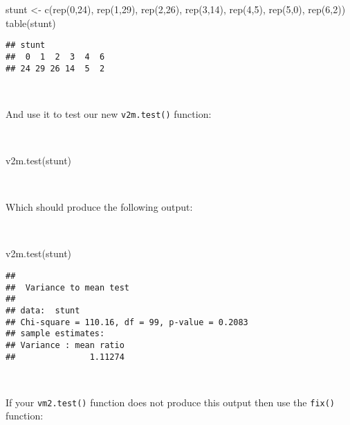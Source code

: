 \documentclass[
  12pt,
  a4paper]{book}
\newenvironment{Shaded}{\begin{snugshade}}{\end{snugshade}}
\newcommand{\DecValTok}[1]{\textcolor[rgb]{0.00,0.00,0.81}{#1}}
\newcommand{\FunctionTok}[1]{\textcolor[rgb]{0.00,0.00,0.00}{#1}}
\newcommand{\NormalTok}[1]{#1}
\newcommand{\OtherTok}[1]{\textcolor[rgb]{0.56,0.35,0.01}{#1}}
\begin{document}
\begin{Shaded}
\begin{Highlighting}[]
\NormalTok{stunt }\OtherTok{\textless{}{-}} \FunctionTok{c}\NormalTok{(}\FunctionTok{rep}\NormalTok{(}\DecValTok{0}\NormalTok{,}\DecValTok{24}\NormalTok{), }\FunctionTok{rep}\NormalTok{(}\DecValTok{1}\NormalTok{,}\DecValTok{29}\NormalTok{), }\FunctionTok{rep}\NormalTok{(}\DecValTok{2}\NormalTok{,}\DecValTok{26}\NormalTok{), }\FunctionTok{rep}\NormalTok{(}\DecValTok{3}\NormalTok{,}\DecValTok{14}\NormalTok{), }\FunctionTok{rep}\NormalTok{(}\DecValTok{4}\NormalTok{,}\DecValTok{5}\NormalTok{),}
           \FunctionTok{rep}\NormalTok{(}\DecValTok{5}\NormalTok{,}\DecValTok{0}\NormalTok{), }\FunctionTok{rep}\NormalTok{(}\DecValTok{6}\NormalTok{,}\DecValTok{2}\NormalTok{))}
\FunctionTok{table}\NormalTok{(stunt)}
\end{Highlighting}
\end{Shaded}

\begin{verbatim}
## stunt
##  0  1  2  3  4  6 
## 24 29 26 14  5  2
\end{verbatim}

~

And use it to test our new \texttt{v2m.test()} function:

~

\begin{Shaded}
\begin{Highlighting}[]
\FunctionTok{v2m.test}\NormalTok{(stunt)}
\end{Highlighting}
\end{Shaded}

~

Which should produce the following output:

~

\begin{Shaded}
\begin{Highlighting}[]
\FunctionTok{v2m.test}\NormalTok{(stunt)}
\end{Highlighting}
\end{Shaded}

\begin{verbatim}
## 
##  Variance to mean test
## 
## data:  stunt
## Chi-square = 110.16, df = 99, p-value = 0.2083
## sample estimates:
## Variance : mean ratio 
##               1.11274
\end{verbatim}

~

If your \texttt{vm2.test()} function does not produce this output then use the \texttt{fix()} function:
\end{document}
